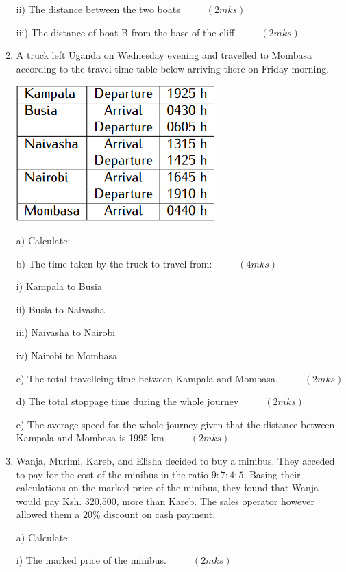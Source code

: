\documentclass[
  a4paperpaper,
]{scrbook}
\begin{document}
\begin{tcolorbox}
\begin{enumerate}
  ii) The distance between the two boats \(\hspace{1cm} (2mks)\)

  iii) The distance of boat B from the base of the cliff
  \(\hspace{1cm}(2mks)\)
\item
  A truck left Uganda on Wednesday evening and travelled to Mombasa
  according to the travel time table below arriving there on Friday
  morning.

  \includegraphics{figures/Md10_Q20.png}

  a) Calculate:

  b) The time taken by the truck to travel from: \(\hspace{1cm} (4mks)\)

  i) Kampala to Busia

  ii) Busia to Naivasha

  iii) Naivasha to Nairobi

  iv) Nairobi to Mombasa

  c) The total travelleing time between Kampala and Mombasa.
  \(\hspace{1cm} (2mks)\)

  d) The total stoppage time during the whole journey
  \(\hspace{1cm} (2mks)\)

  e) The average speed for the whole journey given that the distance
  between Kampala and Mombasa is 1995 km \(\hspace{1cm} (2mks)\)
\item
  Wanja, Murimi, Kareb, and Elisha decided to buy a minibus. They
  acceded to pay for the cost of the minibus in the ratio \(9:7:4:5\).
  Basing their calculations on the marked price of the minibus, they
  found that Wanja would pay Ksh. 320,500, more than Kareb. The sales
  operator however allowed them a \(20\%\) discount on cash payment.

  a) Calculate:

  i) The marked price of the minibus. \(\hspace{1cm} (2mks)\)


\end{enumerate}
\end{tcolorbox}
\end{document}
